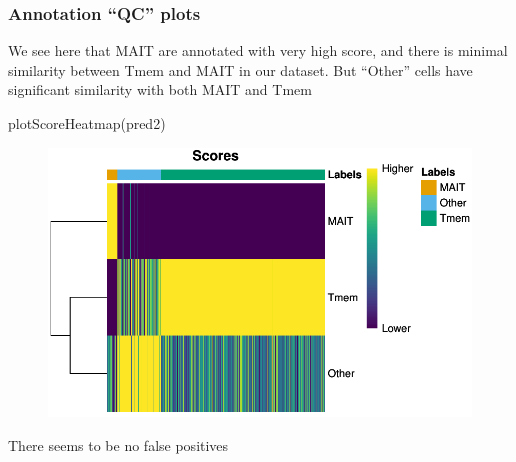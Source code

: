 \documentclass[
  letterpaper,
  DIV=11,
  numbers=noendperiod]{scrartcl}
\newenvironment{Shaded}{\begin{snugshade}}{\end{snugshade}}
\newcommand{\AttributeTok}[1]{\textcolor[rgb]{0.40,0.45,0.13}{#1}}
\newcommand{\FunctionTok}[1]{\textcolor[rgb]{0.28,0.35,0.67}{#1}}
\newcommand{\NormalTok}[1]{\textcolor[rgb]{0.00,0.23,0.31}{#1}}
\newcommand{\OtherTok}[1]{\textcolor[rgb]{0.00,0.23,0.31}{#1}}
\newcommand{\SpecialCharTok}[1]{\textcolor[rgb]{0.37,0.37,0.37}{#1}}
\begin{document}
\begin{Shaded}
\end{Shaded}

\hypertarget{annotation-qc-plots}{%
\subsubsection{Annotation ``QC'' plots}\label{annotation-qc-plots}}

We see here that MAIT are annotated with very high score, and there is
minimal similarity between Tmem and MAIT in our dataset. But ``Other''
cells have significant similarity with both MAIT and Tmem

\begin{Shaded}
\begin{Highlighting}[]
\FunctionTok{plotScoreHeatmap}\NormalTok{(pred2)}
\end{Highlighting}
\end{Shaded}

\begin{figure}[H]

{\centering \includegraphics{2-Lett-data-SingleR_pdf_files/figure-pdf/unnamed-chunk-17-1.pdf}

}

\end{figure}

There seems to be no false positives
\end{document}
